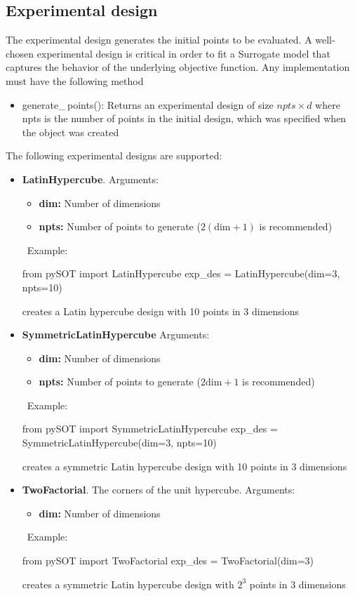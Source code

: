 \documentclass[]{article}
\begin{document}
\subsection{Experimental design} 
\label{expdes}
The experimental design generates the initial points to be evaluated. A well-chosen experimental design is critical in order to fit a Surrogate model that captures the behavior of the underlying objective function. Any implementation must have the following method
\begin{itemize}
\item generate\_\,points(): Returns an experimental design of size $npts \times d$ where npts is the number of points in the initial design, which was specified when the object was created 
\end{itemize}
The following experimental designs are supported:
\begin{itemize}

\item \textbf{LatinHypercube}. Arguments:
\begin{itemize}
\item \textbf{dim:} Number of dimensions
\item \textbf{npts:} Number of points to generate ($2( \text{dim}+1)$ is recommended)
\end{itemize} 
\ \newline Example: 
\begin{python}
from pySOT import LatinHypercube
exp_des = LatinHypercube(dim=3, npts=10)
\end{python}
creates a Latin hypercube design with 10 points in 3 dimensions

\item \textbf{SymmetricLatinHypercube} Arguments:
\begin{itemize}
\item \textbf{dim:} Number of dimensions
\item \textbf{npts:} Number of points to generate ($2 \text{dim}+1$ is recommended)
\end{itemize}
\ \newline Example: 
\begin{python}
from pySOT import SymmetricLatinHypercube
exp_des = SymmetricLatinHypercube(dim=3, npts=10)
\end{python}
creates a symmetric Latin hypercube design with 10 points in 3 dimensions

\item \textbf{TwoFactorial}. The corners of the unit hypercube. Arguments:
\begin{itemize}
\item \textbf{dim:} Number of dimensions
\end{itemize} 
\ \newline Example: 
\begin{python}
from pySOT import TwoFactorial
exp_des = TwoFactorial(dim=3)
\end{python}
creates a symmetric Latin hypercube design with $2^3$ points in 3 dimensions


\end{itemize}
\end{document}
